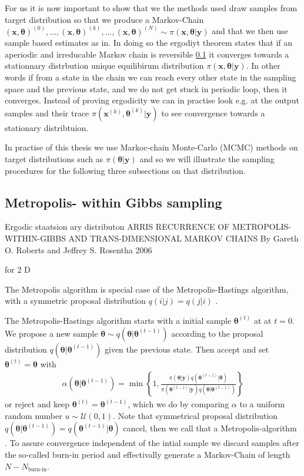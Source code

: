 For us it is now important to show that we the methods used draw samples from target distribution so that we produce a Markov-Chain $ (\bm{x}, \bm{\theta} )^{(0)}, \dots, (\bm{x}, \bm{\theta} )^{(k)} , \dots,  (\bm{x}, \bm{\theta})^{(N)} \sim \pi(\bm{x},\bm{\theta}| \bm{y}) $ and that we then use sample based estimates as in.
In doing so the ergodiyt theorem states that  if an aperiodic and irreducable Markov chain is reversible \ref{} it converges towards a stationnary distrbution unique equilibirum distribution $\pi(\bm{x},\bm{\theta}| \bm{y}) $.
In other words if from a state in the chain we can reach every other state in the sampling space and the previous state, and we do not get stuck in periodic loop, then it converges.
Instead of proving ergodicity we can in practise look e.g. at the output samples and their trace $\pi(\bm{x}^{(k)},\bm{\theta}^{(k)}| \bm{y})$ to see convergence towards a stationary distribtuion.


In practise of this thesis we use Markoc-chain Monte-Carlo (MCMC) methods on target distributions such as $\pi(\bm{\theta}| \bm{y})$ and so we will illustrate the sampling procedures for the following three subsections on that distribution.


\subsection{Metropolis- within Gibbs sampling}
Ergodic staatsion ary distributon 
\cite{}
ARRIS RECURRENCE OF METROPOLIS-WITHIN-GIBBS AND
TRANS-DIMENSIONAL MARKOV CHAINS
By Gareth O. Roberts and Jeffrey S. Rosentha 2006


for 2 D

The Metropolis algorithm is special case of the Metropolis-Hastings algorithm, with a symmetric proposal distribution $q(i|j) =q(j|i) $ \cite{}.

The Metropolis-Hastings algorithm starts with a initial sample $\bm{\theta}^{(t)}$ at  at $t=0$.
We propose a new sample $\bm{\theta}\sim q(\bm{\theta} | \bm{\theta}^{(t-1)})$ according to the proposal distribution $q(\bm{\theta} | \bm{\theta}^{(t-1)})$ given the previous state.
Then accept and set $ \bm{\theta}^{(t)} = \bm{\theta}$ with
\begin{align}
	\alpha(\bm{\theta} | \bm{\theta}^{(t-1)}) = \min \left\{ 1, \frac{\pi(\bm{\theta}  | \bm{y}) q(\bm{\theta}^{(t-1)} | \bm{\theta})  }{\pi(\bm{\theta}^{(t-1)}| \bm{y}) q(\bm{\theta} | \bm{\theta}^{(t-1)}) } \right\}
\end{align}
or reject and keep $\bm{\theta}^{(t)} = \bm{\theta}^{(t-1)}$, which we do by comparing $\alpha$ to a uniform random number $u \sim \mathcal{U}(0,1)$.
Note that symmetrical proposal distribution $q(\bm{\theta} | \bm{\theta}^{(t-1)}) = q(\bm{\theta}^{(t-1)} | \bm{\theta}) $ cancel, then we call that a Metropolis-algorithm \cite{}.
To assure convergence independent of the intial sample we discard samples after the so-called burn-in period and effectivally generate a Markov-Chain of length $N - N_{\text{burn-in}}$.


